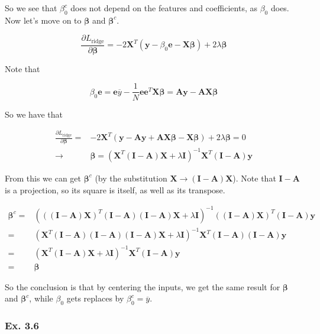\documentclass{article}
\begin{document}
So we see that $\beta^c_0$ does not depend on the features and coefficients, as $\beta_0$ does. Now let's move on to $\bm{\beta}$ and $\bm{\beta}^c$.

\[
\frac{\partial L_{\text{ridge}}}{\partial \bm{\beta}} = -2\mathbf{X}^T (\mathbf{y} - \beta_0 \mathbf{e} - \mathbf{X}\bm{\beta}) + 2\lambda \bm{\beta}
\]

Note that

\[
\beta_0 \mathbf{e} = \mathbf{e} \overline{y} - \frac1N \mathbf{e} \mathbf{e}^T \mathbf{X} \bm{\beta} = \mathbf{A}\mathbf{y} - \mathbf{A}\mathbf{X}\bm{\beta}
\]

So we have that

\[
\begin{split}
\frac{\partial L_{\text{ridge}}}{\partial \bm{\beta}} =& -2\mathbf{X}^T (\mathbf{y} - \mathbf{A}\mathbf{y} + \mathbf{A}\mathbf{X}\bm{\beta} - \mathbf{X}\bm{\beta}) + 2\lambda \bm{\beta} = 0\\
\to& \bm{\beta} = (\mathbf{X}^T(\mathbf{I} - \mathbf{A})\mathbf{X} + \lambda \mathbf{I})^{-1} \mathbf{X}^T (\mathbf{I} - \mathbf{A})\mathbf{y}
\end{split}
\]

From this we can get $\bm{\beta}^c$ (by the substitution $\mathbf{X} \to (\mathbf{I} - \mathbf{A})\mathbf{X}$). Note that $\mathbf{I} - \mathbf{A}$ is a projection, so its square is itself, as well as its transpose.

\[
\begin{split}
\bm{\beta}^c =& (((\mathbf{I} - \mathbf{A})\mathbf{X})^T(\mathbf{I} - \mathbf{A})(\mathbf{I} - \mathbf{A})\mathbf{X} + \lambda \mathbf{I})^{-1} ((\mathbf{I} - \mathbf{A})\mathbf{X})^T (\mathbf{I} - \mathbf{A})\mathbf{y}\\
=& (\mathbf{X}^T(\mathbf{I} - \mathbf{A})(\mathbf{I} - \mathbf{A})(\mathbf{I} - \mathbf{A})\mathbf{X} + \lambda \mathbf{I})^{-1} \mathbf{X}^T (\mathbf{I} - \mathbf{A})(\mathbf{I} - \mathbf{A})\mathbf{y}\\
=& (\mathbf{X}^T(\mathbf{I} - \mathbf{A})\mathbf{X} + \lambda \mathbf{I})^{-1} \mathbf{X}^T (\mathbf{I} - \mathbf{A})\mathbf{y}\\
=& \bm{\beta}
\end{split}
\]

So the conclusion is that by centering the inputs, we get the same result for $\bm{\beta}$ and $\bm{\beta}^c$, while $\beta_0$ gets replaces by $\beta^c_0 = \overline{y}$.

\subsubsection{Ex. 3.6}
\end{document}
